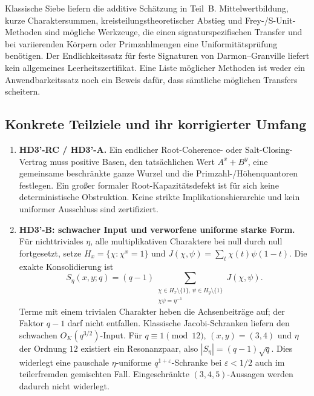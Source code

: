\documentclass[11pt,a4paper]{article}
\begin{document}
Klassische Siebe liefern die additive Schätzung in Teil~B.
Mittelwertbildung, kurze Charaktersummen, kreisteilungstheoretischer
Abstieg und Frey-/S-Unit-Methoden sind mögliche Werkzeuge, die einen
signaturspezifischen Transfer und bei variierenden Körpern oder
Primzahlmengen eine Uniformitätsprüfung benötigen.
Der Endlichkeitssatz für feste Signaturen von Darmon--Granville
\cite{DarmonGranville1995} liefert kein allgemeines Leerheitszertifikat.
Eine Liste möglicher Methoden ist weder ein Anwendbarkeitssatz noch
ein Beweis dafür, dass sämtliche möglichen Transfers scheitern.

\subsection*{Konkrete Teilziele und ihr korrigierter Umfang}
\begin{enumerate}[leftmargin=*]
\item \textbf{HD3'-RC / HD3'-A.} Ein endlicher Root-Coherence- oder
Salt-Closing-Vertrag muss positive Basen, den tatsächlichen Wert
$A^x+B^y$, eine gemeinsame beschränkte ganze Wurzel und die
Primzahl-/Höhenquantoren festlegen. Ein großer formaler
Root-Kapazitätsdefekt ist für sich keine deterministische Obstruktion.
Keine strikte Implikationshierarchie und kein uniformer Ausschluss sind zertifiziert.
\item \textbf{HD3'-B: schwacher Input und verworfene uniforme starke Form.}
Für nichttriviales $\eta$, alle multiplikativen Charaktere bei null
durch null fortgesetzt, setze $H_x=\{\chi:\chi^x=1\}$ und
$J(\chi,\psi)=\sum_t\chi(t)\psi(1-t)$. Die exakte Konsolidierung ist
\[
 S_\eta(x,y;q)=(q-1)
 \sum_{\substack{\chi\in H_x\setminus\{1\},\,\psi\in H_y\setminus\{1\}\\
                 \chi\psi=\eta^{-1}}}J(\chi,\psi).
\]
Terme mit einem trivialen Charakter heben die Achsenbeiträge auf;
der Faktor $q-1$ darf nicht entfallen. Klassische Jacobi-Schranken
\cite[Ch.~8]{IrelandRosen} liefern den schwachen $O_K(q^{3/2})$-Input.
Für $q\equiv1\pmod{12}$, $(x,y)=(3,4)$ und $\eta$ der Ordnung $12$
existiert ein Resonanzpaar, also $|S_\eta|=(q-1)\sqrt q$.
Dies widerlegt eine pauschale $\eta$-uniforme $q^{1+\varepsilon}$-Schranke
bei $\varepsilon<1/2$ auch im teilerfremden gemischten Fall.
Eingeschränkte $(3,4,5)$-Aussagen werden dadurch nicht widerlegt.


\end{enumerate}
\end{document}
